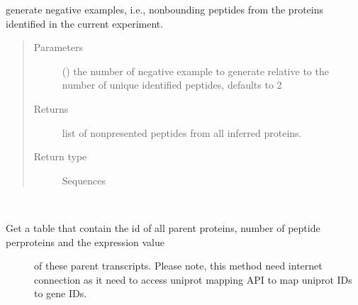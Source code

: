 \documentclass[letterpaper,10pt,english]{sphinxmanual}
\begin{document}
\begin{fulllineitems}
\begin{fulllineitems}
\label{\detokenize{IPTK.Classes:IPTK.Classes.Experiment.Experiment.get_negative_example}}
generate negative examples, i.e., non\sphinxhyphen{}bounding peptides from the proteins identified in the current experiment.
\begin{quote}\begin{description}
\item[{Parameters}] \leavevmode
{} (\sphinxstyleliteralemphasis{\sphinxupquote{, }}) \textendash{} the number of negative example to generate relative to the number of unique identified peptides, defaults to 2

\item[{Returns}] \leavevmode
list of non\sphinxhyphen{}presented peptides from all inferred proteins.

\item[{Return type}] \leavevmode
Sequences

\end{description}\end{quote}

\end{fulllineitems}


\begin{fulllineitems}
\label{\detokenize{IPTK.Classes:IPTK.Classes.Experiment.Experiment.get_num_peptide_expression_table}}~\begin{description}
\item[{Get a table that contain the id of all parent proteins, number of peptide per\sphinxhyphen{}proteins and the expression value }] \leavevmode
of these parent transcripts. Please note, this method need internet connection as it need to access uniprot mapping API to map uniprot IDs to gene IDs.


\end{description}
\end{fulllineitems}
\end{fulllineitems}
\end{document}
